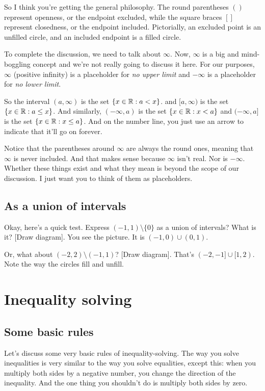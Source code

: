 \documentclass{amsart}
\begin{document}
So I think you're getting the general philosophy. The round
parentheses $()$ represent openness, or the endpoint excluded, while
the square braces $[]$ represent closedness, or the endpoint
included. Pictorially, an excluded point is an unfilled circle, and an
included endpoint is a filled circle.

To complete the discussion, we need to talk about $\infty$. Now,
$\infty$ is a big and mind-boggling concept and we're not really going
to discuss it here. For our purposes, $\infty$ (positive infinity) is
a placeholder for {\em no upper limit} and $-\infty$ is a placeholder
for {\em no lower limit}.

So the interval $(a,\infty)$ is the set $\{x \in \mathbb{R} : a < x \}$. and
$[a,\infty)$ is the set $\{ x \in \mathbb{R}: a \le x \}$. And similarly,
$(-\infty,a)$ is the set $\{ x \in \mathbb{R} : x < a \}$ and $(-\infty,a]$ is
the set $\{ x \in \mathbb{R}: x \le a \}$. And on the number line, you just
use an arrow to indicate that it'll go on forever.

Notice that the parentheses around $\infty$ are always the round ones,
meaning that $\infty$ is never included. And that makes sense because
$\infty$ isn't real. Nor is $-\infty$. Whether these things exist and
what they mean is beyond the scope of our discussion. I just want you
to think of them as placeholders.

\subsection{As a union of intervals}

Okay, here's a quick test. Express $(-1,1) \setminus \{ 0 \}$ as a
union of intervals? What is it? [Draw diagram]. You see the
picture. It is $(-1,0) \cup (0,1)$.

Or, what about $(-2,2) \setminus (-1,1)$? [Draw diagram]. That's
$(-2,-1] \cup [1,2)$. Note the way the circles fill and unfill.

\section{Inequality solving}

\subsection{Some basic rules}

Let's discuss some very basic rules of inequality-solving. The way you
solve inequalities is very similar to the way you solve equalities,
except this: when you multiply both sides by a negative number, you
change the direction of the inequality. And the one thing you
shouldn't do is multiply both sides by zero.
\end{document}

